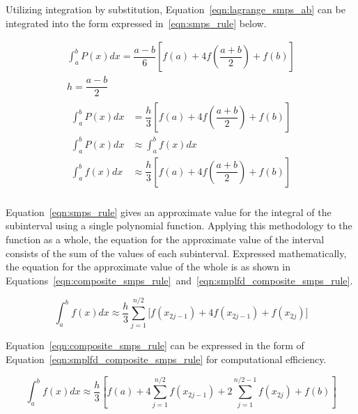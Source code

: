 \documentclass{paper}
\begin{document}
\noindent
Utilizing integration by substitution, Equation~\ref{eqn:lagrange_smps_ab} can be integrated into the form expressed in~\eqref{eqn:smps_rule} below.

\begin{equation}
    \label{eqn:smps_rule}
    \begin{gathered}
    \int_a^b P(x) dx = \dfrac{a - b}{6} \left[f(a) + 4f\left(\dfrac{a + b}{2}\right) + f(b)\right]          \\
    h = \dfrac{a - b}{2}                                                                                    \\
    \begin{aligned}
        \int_a^b P(x) dx &= \dfrac{h}{3} \left[f(a) + 4f\left(\dfrac{a + b}{2}\right) + f(b)\right]         \\
        \int_a^b P(x) dx &\approx \int_a^b f(x) dx                                                          \\
        \int_a^b f(x) dx &\approx \dfrac{h}{3} \left[f(a) + 4f\left(\dfrac{a + b}{2}\right) + f(b)\right]   \\
    \end{aligned}
\end{gathered}
\end{equation}

\noindent
Equation~\ref{eqn:smps_rule} gives an approximate value for the integral of the subinterval using a single polynomial function.
Applying this methodology to the function as a whole, the equation for the approximate value of the interval consists of the sum of the values of each subinterval.
Expressed mathematically, the equation for the approximate value of the whole is as shown in Equations~\ref{eqn:composite_smps_rule}~and~\ref{eqn:smplfd_composite_smps_rule}.

\begin{equation}
    \label{eqn:composite_smps_rule}
    \int_a^b f(x) dx \approx \dfrac{h}{3} \sum_{j=1}^{n / 2} \biggl[f(x_{2j-1}) + 4f(x_{2j-1}) + f(x_{2j})\biggr]
\end{equation}

\noindent
Equation~\ref{eqn:composite_smps_rule} can be expressed in the form of Equation~\ref{eqn:smplfd_composite_smps_rule} for computational efficiency.

\begin{equation}
    \label{eqn:smplfd_composite_smps_rule}
    \int_a^b f(x) dx \approx \dfrac{h}{3} \left[f(a) + 4 \sum_{j=1}^{n / 2} f(x_{2j-1}) + 2  \sum_{j=1}^{n / 2 - 1} f(x_{2j}) + f(b)\right]
\end{equation}
\end{document}
